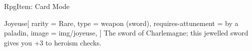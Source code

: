 \begin{ExampleBlock}{RpgItem: Card Mode}
\begin{RpgItem}[width=5.5cm, height=8cm]{Joyeuse}[
    rarity = Rare,
    type = weapon (sword),
    requires-attunement = {by a paladin},
    image = {img/joyeuse},
]
    The sword of Charlemagne; this jewelled sword gives you +3 to heroism checks.
\end{RpgItem}


\end{ExampleBlock}
